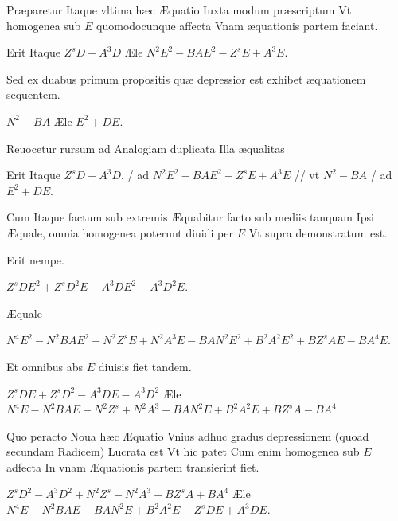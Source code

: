 \documentclass[11pt,a4paper]{article}
\begin{document}
Præparetur Itaque vltima hæc Æquatio Iuxta modum præscriptum Vt homogenea sub $E$ quomodocunque affecta Vnam æquationis partem faciant.

Erit Itaque $Z^sD - A^3D$ Æle $N^2E^2 - BAE^2 - Z^sE + A^3E$.

Sed ex duabus primum propositis quæ depressior est exhibet æquationem sequentem.

$N^2 - BA$ Æle $E^2 + DE$.

Reuocetur rursum ad \struck{\ill{}} Analogiam duplicata Illa æqualitas

Erit Itaque $Z^sD - A^3D$. / ad $N^2E^2 - BAE^2 - Z^sE + A^3E$ // vt $N^2 - BA$ / ad $E^2 + DE$.

Cum Itaque factum sub extremis Æquabitur facto sub mediis  tanquam Ipsi Æquale,  omnia homogenea poterunt diuidi per $E$ Vt supra demonstratum est.

Erit nempe.

$Z^sDE^2 + Z^sD^2E - A^3DE^2 - A^3D^2E$.


Æquale

$N^4E^2 - N^2BAE^2 - N^2Z^sE + N^2A^3E - BAN^2E^2 + B^2A^2E^2 + BZ^sAE - BA^4E$.

Et omnibus abs $E$ diuisis fiet tandem.

$Z^sDE + Z^sD^2 - A^3DE - A^3D^2$ Æle $N^4E - N^2BAE - N^2Z^s + N^2A^3 - BAN^2E + B^2A^2E + BZ^sA - BA^4$

Quo peracto Noua hæc Æquatio Vnius adhuc gradus depressionem (quoad secundam Radicem) Lucrata est Vt hic patet Cum enim homogenea sub $E$ adfecta In vnam Æquationis partem transierint fiet.

$Z^sD^2 - A^3D^2 + N^2Z^s - N^2A^3 - BZ^sA + BA^4$ Æle $N^4E - N^2BAE - BAN^2E + B^2A^2E - Z^sDE + A^3DE$.
\end{document}
